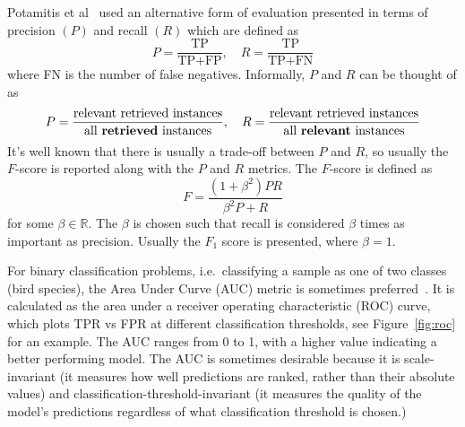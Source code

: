 Potamitis et al~\cite{potamitis2014automatic} used an alternative form of
evaluation presented in terms of precision $(P)$ and recall $(R)$ which are
defined as
\begin{equation}
  P = \frac{\text{TP}}{\text{TP}+\text{FP}}, \hspace{1em}
  R = \frac{\text{TP}}{\text{TP}+\text{FN}}
\end{equation}
where FN is the number of false negatives. Informally, $P$ and $R$ can be
thought of as
\begin{equation}
  P = \frac{\text{relevant retrieved instances}}{\text{all \textbf{retrieved} instances}}, \hspace{1em}
  R = \frac{\text{relevant retrieved instances}}{\text{all \textbf{relevant} instances}}
\end{equation}
It's well known that there is usually a trade-off between $P$ and $R$, so
usually the $F$-score is reported along with the $P$ and $R$ metrics. The
$F$-score is defined as
\begin{equation}
F = \frac{(1+\beta^2)PR}{\beta^2P + R}
\end{equation}
for some $\beta \in \mathbb{R}$. The $\beta$ is chosen such that recall is
considered $\beta$ times as important as precision. Usually the $F_1$ score is
presented, where $\beta = 1$.

For binary classification problems, i.e.\ classifying a sample as one of two
classes (bird species), the Area Under Curve (AUC) metric is sometimes
preferred~\cite{leng2014multi}. It is calculated as the area under a receiver
operating characteristic (ROC) curve, which plots TPR vs FPR at different
classification thresholds, see Figure~\ref{fig:roc} for an example. The AUC
ranges from 0 to 1, with a higher value indicating a better performing model.
The AUC is sometimes desirable because it is scale-invariant (it measures how
well predictions are ranked, rather than their absolute values) and
classification-threshold-invariant (it measures the quality of the model's
predictions regardless of what classification threshold is chosen.)

